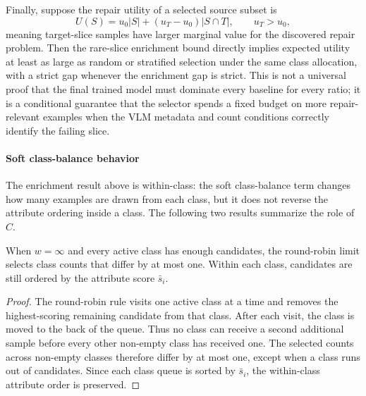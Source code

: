Finally, suppose the repair utility of a selected source subset is
\begin{equation}
\label{eq:repair-utility}
U(S)=u_0 |S| + (u_T-u_0)|S\cap T|,
\qquad u_T>u_0,
\end{equation}
meaning target-slice samples have larger marginal value for the discovered repair problem. Then the rare-slice enrichment bound directly implies expected utility at least as large as random or stratified selection under the same class allocation, with a strict gap whenever the enrichment gap is strict. This is not a universal proof that the final trained model must dominate every baseline for every ratio; it is a conditional guarantee that the selector spends a fixed budget on more repair-relevant examples when the VLM metadata and count conditions correctly identify the failing slice.

\paragraph{Soft class-balance behavior}
The enrichment result above is within-class: the soft class-balance term changes how many examples are drawn from each class, but it does not reverse the attribute ordering inside a class. The following two results summarize the role of $C$.

\begin{tcolorbox}[
    colback=blue!2!white,
    colframe=blue!20!white,
    arc=3pt,
    boxrule=1pt,
    drop shadow,
    breakable
]
\begin{proposition}
\label{prop:hard-balance-limit}
When $w=\infty$ and every active class has enough candidates, the round-robin limit selects class counts that differ by at most one. Within each class, candidates are still ordered by the attribute score $\bar{s}_i$.
\end{proposition}
\end{tcolorbox}

\begin{tcolorbox}[
    colback=green!2!white,
    colframe=green!20!white,
    arc=3pt,
    boxrule=1pt,
    drop shadow,
    breakable
]
\begin{proof}
The round-robin rule visits one active class at a time and removes the highest-scoring remaining candidate from that class. After each visit, the class is moved to the back of the queue. Thus no class can receive a second additional sample before every other non-empty class has received one. The selected counts across non-empty classes therefore differ by at most one, except when a class runs out of candidates. Since each class queue is sorted by $\bar{s}_i$, the within-class attribute order is preserved.
\end{proof}
\end{tcolorbox}

